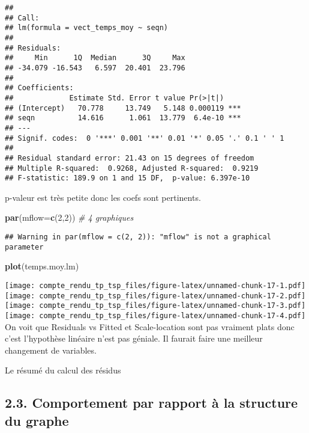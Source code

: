 \documentclass[
]{article}
\newenvironment{Shaded}{\begin{snugshade}}{\end{snugshade}}
\newcommand{\CommentTok}[1]{\textcolor[rgb]{0.56,0.35,0.01}{\textit{#1}}}
\newcommand{\DataTypeTok}[1]{\textcolor[rgb]{0.13,0.29,0.53}{#1}}
\newcommand{\DecValTok}[1]{\textcolor[rgb]{0.00,0.00,0.81}{#1}}
\newcommand{\KeywordTok}[1]{\textcolor[rgb]{0.13,0.29,0.53}{\textbf{#1}}}
\newcommand{\NormalTok}[1]{#1}
\begin{document}
\begin{verbatim}
## 
## Call:
## lm(formula = vect_temps_moy ~ seqn)
## 
## Residuals:
##     Min      1Q  Median      3Q     Max 
## -34.079 -16.543   6.597  20.401  23.796 
## 
## Coefficients:
##             Estimate Std. Error t value Pr(>|t|)    
## (Intercept)   70.778     13.749   5.148 0.000119 ***
## seqn          14.616      1.061  13.779  6.4e-10 ***
## ---
## Signif. codes:  0 '***' 0.001 '**' 0.01 '*' 0.05 '.' 0.1 ' ' 1
## 
## Residual standard error: 21.43 on 15 degrees of freedom
## Multiple R-squared:  0.9268, Adjusted R-squared:  0.9219 
## F-statistic: 189.9 on 1 and 15 DF,  p-value: 6.397e-10
\end{verbatim}

p-valeur est très petite donc les coefs sont pertinents.

\begin{Shaded}
\begin{Highlighting}[]
\KeywordTok{par}\NormalTok{(}\DataTypeTok{mflow=}\KeywordTok{c}\NormalTok{(}\DecValTok{2}\NormalTok{,}\DecValTok{2}\NormalTok{)) }\CommentTok{# 4 graphiques}
\end{Highlighting}
\end{Shaded}

\begin{verbatim}
## Warning in par(mflow = c(2, 2)): "mflow" is not a graphical parameter
\end{verbatim}

\begin{Shaded}
\begin{Highlighting}[]
\KeywordTok{plot}\NormalTok{(temps.moy.lm)}
\end{Highlighting}
\end{Shaded}

\texttt{[image: compte\_rendu\_tp\_tsp\_files/figure-latex/unnamed-chunk-17-1.pdf]}
\texttt{[image: compte\_rendu\_tp\_tsp\_files/figure-latex/unnamed-chunk-17-2.pdf]}
\texttt{[image: compte\_rendu\_tp\_tsp\_files/figure-latex/unnamed-chunk-17-3.pdf]}
\texttt{[image: compte\_rendu\_tp\_tsp\_files/figure-latex/unnamed-chunk-17-4.pdf]}
On voit que Residuals vs Fitted et Scale-location sont pas vraiment
plats donc c'est l'hypothèse linéaire n'est pas géniale. Il faurait
faire une meilleur changement de variables.

Le résumé du calcul des résidus

\hypertarget{comportement-par-rapport-uxe0-la-structure-du-graphe}{%
\subsection{2.3. Comportement par rapport à la structure du
graphe}\label{comportement-par-rapport-uxe0-la-structure-du-graphe}}
\end{document}
